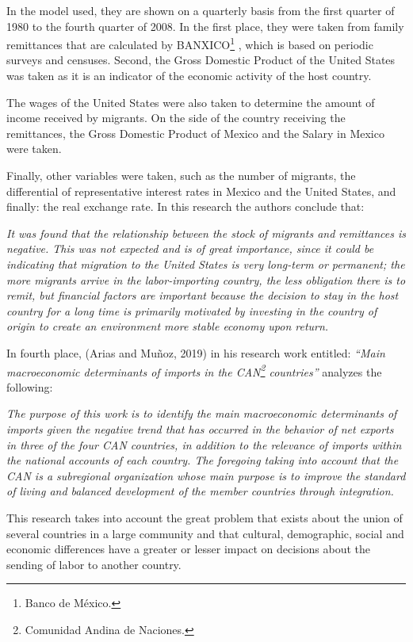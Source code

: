 \documentclass[12pt,english, spanish]{smfart}
\begin{document}
In the model used, they are shown on a quarterly basis from the first quarter of 1980 to the fourth quarter of 2008. In the first place, they were taken from family remittances that are calculated by BANXICO\footnote{Banco de México.} , which is based on periodic surveys and censuses. Second, the Gross Domestic Product of the United States was taken as it is an indicator of the economic activity of the host country.\par 
The wages of the United States were also taken to determine the amount of income received by migrants. On the side of the country receiving the remittances, the Gross Domestic Product of Mexico and the Salary in Mexico were taken.\par 
Finally, other variables were taken, such as the number of migrants, the differential of representative interest rates in Mexico and the United States, and finally: the real exchange rate. In this research the authors conclude that:\par
\textit{It was found that the relationship between the stock of migrants and remittances is negative. This was not expected and is of great importance, since it could be indicating that migration to the United States is very long-term or permanent; the more migrants arrive in the labor-importing country, the less obligation there is to remit, but financial factors are important because the decision to stay in the host country for a long time is primarily motivated by investing in the country of origin to create an environment more stable economy upon return.}\par	
In fourth place, (Arias and Muñoz, 2019) in his research work entitled: \textit{“Main macroeconomic determinants of imports in the CAN\footnote{Comunidad Andina de Naciones.}   countries”} analyzes the following:\par
\textit{The purpose of this work is to identify the main macroeconomic determinants of imports given the negative trend that has occurred in the behavior of net exports in three of the four CAN countries, in addition to the relevance of imports within the national accounts of each country. The foregoing taking into account that the CAN is a subregional organization whose main purpose is to improve the standard of living and balanced development of the member countries through integration.}\par
This research takes into account the great problem that exists about the union of several countries in a large community and that cultural, demographic, social and economic differences have a greater or lesser impact on decisions about the sending of labor to another country.\par 
\end{document}
